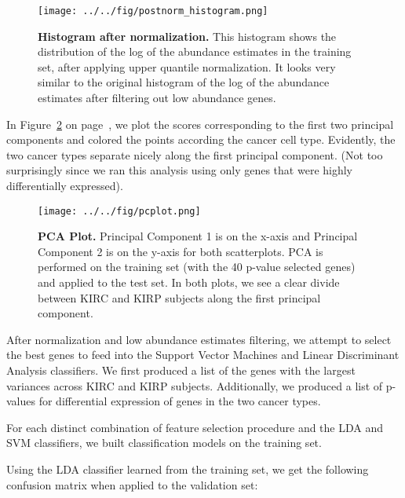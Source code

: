 \begin{figure}[H]
  \centering
    \texttt{[image: ../../fig/postnorm\_histogram.png]}
\caption{\textbf{Histogram after normalization.} This histogram shows the distribution
  of the log of the abundance estimates in the training set, after applying upper quantile
  normalization. It looks very similar to the original histogram of the
  log of the abundance estimates after filtering out low abundance genes.}
   \label{fig:histogrampost}
\end{figure}

In Figure~\ref{fig:pca} on page~\pageref{fig:pca}, we plot the scores
corresponding to the first two principal components and colored the points
according the cancer cell type.  Evidently, the two cancer types separate
nicely along the first principal component. (Not too surprisingly since we ran
this analysis using only genes that were highly differentially expressed).  

\begin{figure}[H]
  \centering
    \texttt{[image: ../../fig/pcplot.png]}
\caption{\textbf{PCA Plot.} Principal Component 1 is on the x-axis and Principal
  Component 2 is on the y-axis for both scatterplots.  PCA is performed on the
  training set (with the 40 p-value selected genes) and applied to the test set.
  In both plots, we see a clear divide between 	KIRC and KIRP subjects along
  the first principal component.}
   \label{fig:pca}
\end{figure}

After normalization and low abundance estimates filtering, we attempt to select the
best genes to feed into the Support Vector Machines and Linear Discriminant
Analysis classifiers.  We first produced a list of the genes with the largest
variances across KIRC and KIRP subjects.
Additionally, we produced a list of p-values for
differential expression of genes in the two cancer types.


For each distinct combination of feature selection procedure and the LDA and
SVM classifiers, we built classification models on the training set.

Using the LDA classifier learned from the training set, we get the following
confusion matrix when applied to the validation set:

